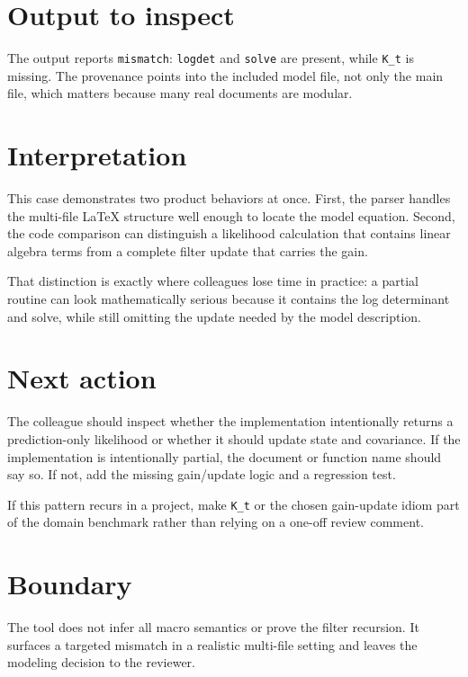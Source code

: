 \documentclass[12pt,a4paper,openany]{book}
\begin{document}
\section*{Output to inspect}

The output reports \texttt{mismatch}: \texttt{logdet} and \texttt{solve} are
present, while \texttt{K\_t} is missing. The provenance points into the
included model file, not only the main file, which matters because many real
documents are modular.

\section*{Interpretation}

This case demonstrates two product behaviors at once. First, the parser handles
the multi-file LaTeX structure well enough to locate the model equation. Second,
the code comparison can distinguish a likelihood calculation that contains
linear algebra terms from a complete filter update that carries the gain.

That distinction is exactly where colleagues lose time in practice: a partial
routine can look mathematically serious because it contains the log determinant
and solve, while still omitting the update needed by the model description.

\section*{Next action}

The colleague should inspect whether the implementation intentionally returns a
prediction-only likelihood or whether it should update state and covariance. If
the implementation is intentionally partial, the document or function name
should say so. If not, add the missing gain/update logic and a regression test.

If this pattern recurs in a project, make \texttt{K\_t} or the chosen
gain-update idiom part of the domain benchmark rather than relying on a one-off
review comment.

\section*{Boundary}

The tool does not infer all macro semantics or prove the filter recursion. It
surfaces a targeted mismatch in a realistic multi-file setting and leaves the
modeling decision to the reviewer.
\end{document}
